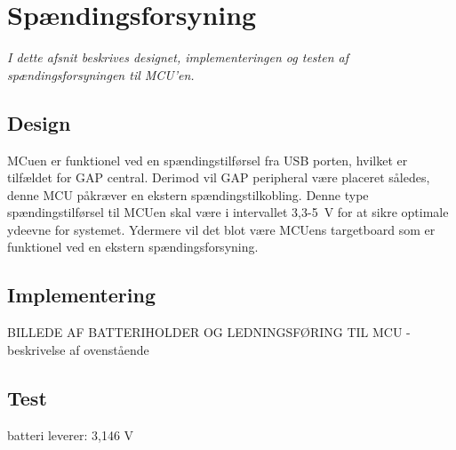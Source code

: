 \section{Spændingsforsyning}
\textit{I dette afsnit beskrives designet, implementeringen og testen af spændingsforsyningen til MCU'en.}

\subsection{Design}
MCuen er funktionel ved en spændingstilførsel fra USB porten, hvilket er tilfældet for GAP central. Derimod vil GAP peripheral være placeret således, denne MCU påkræver en ekstern spændingstilkobling. Denne type spændingstilførsel til MCUen skal være i intervallet 3,3-5~V for at sikre optimale ydeevne for systemet. Ydermere vil det blot være MCUens targetboard som er funktionel ved en ekstern spændingsforsyning. \newline


\subsection{Implementering}
BILLEDE AF BATTERIHOLDER OG LEDNINGSFØRING TIL MCU
- beskrivelse af ovenstående

\subsection{Test} 

batteri leverer: 3,146 V


